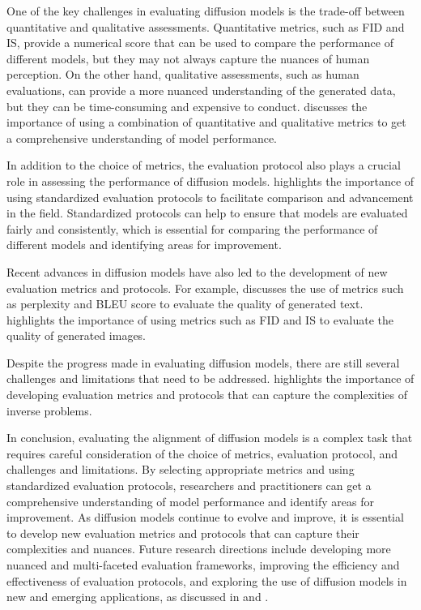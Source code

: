 \documentclass[11pt,a4paper]{article}
\begin{document}
One of the key challenges in evaluating diffusion models is the trade-off between quantitative and qualitative assessments. Quantitative metrics, such as FID and IS, provide a numerical score that can be used to compare the performance of different models, but they may not always capture the nuances of human perception. On the other hand, qualitative assessments, such as human evaluations, can provide a more nuanced understanding of the generated data, but they can be time-consuming and expensive to conduct. \cite{doi:10.1109/tkde.2024.3361474} discusses the importance of using a combination of quantitative and qualitative metrics to get a comprehensive understanding of model performance.

In addition to the choice of metrics, the evaluation protocol also plays a crucial role in assessing the performance of diffusion models. \cite{arxiv:2210.09292} highlights the importance of using standardized evaluation protocols to facilitate comparison and advancement in the field. Standardized protocols can help to ensure that models are evaluated fairly and consistently, which is essential for comparing the performance of different models and identifying areas for improvement.

Recent advances in diffusion models have also led to the development of new evaluation metrics and protocols. For example, \cite{arxiv:2303.07576} discusses the use of metrics such as perplexity and BLEU score to evaluate the quality of generated text. \cite{doi:10.1111/cgf.15063} highlights the importance of using metrics such as FID and IS to evaluate the quality of generated images.

Despite the progress made in evaluating diffusion models, there are still several challenges and limitations that need to be addressed. \cite{arxiv:2410.00083} highlights the importance of developing evaluation metrics and protocols that can capture the complexities of inverse problems.

In conclusion, evaluating the alignment of diffusion models is a complex task that requires careful consideration of the choice of metrics, evaluation protocol, and challenges and limitations. By selecting appropriate metrics and using standardized evaluation protocols, researchers and practitioners can get a comprehensive understanding of model performance and identify areas for improvement. As diffusion models continue to evolve and improve, it is essential to develop new evaluation metrics and protocols that can capture their complexities and nuances. Future research directions include developing more nuanced and multi-faceted evaluation frameworks, improving the efficiency and effectiveness of evaluation protocols, and exploring the use of diffusion models in new and emerging applications, as discussed in \cite{doi:10.1145/3626235} and \cite{arxiv:2402.16369}. 
\end{document}
